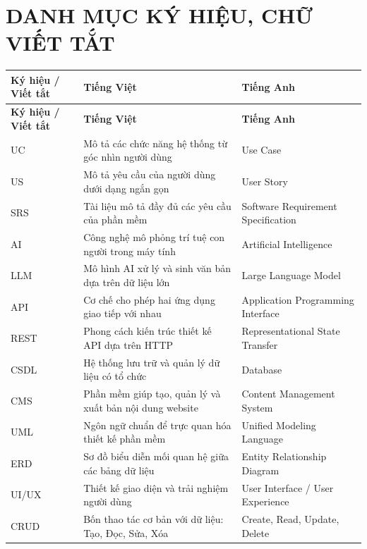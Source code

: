 \documentclass[13pt,a4paper,oneside]{extreport}
\numberwithin{equation}{chapter}
\numberwithin{figure}{chapter}
\numberwithin{table}{chapter}
\begin{document}
\chapter*{DANH MỤC KÝ HIỆU, CHỮ VIẾT TẮT}
\begin{center}
  \begin{longtable}{|>{\centering\arraybackslash}p{}|p{}|p{}|}
    \hline
    \rowcolor[gray]{0.9} \textbf{Ký hiệu / Viết tắt} & \textbf{Tiếng Việt} & \textbf{Tiếng Anh} \\
    \hline
    \endfirsthead
    \hline
    \rowcolor[gray]{0.9} \textbf{Ký hiệu / Viết tắt} & \textbf{Tiếng Việt} & \textbf{Tiếng Anh} \\
    \hline
    \endhead
    \hline
    \endfoot
    UC & Mô tả các chức năng hệ thống từ góc nhìn người dùng & Use Case \\ \hline
    US & Mô tả yêu cầu của người dùng dưới dạng ngắn gọn & User Story \\ \hline
    SRS & Tài liệu mô tả đầy đủ các yêu cầu của phần mềm & Software Requirement Specification \\ \hline
    AI & Công nghệ mô phỏng trí tuệ con người trong máy tính & Artificial Intelligence \\ \hline
    LLM & Mô hình AI xử lý và sinh văn bản dựa trên dữ liệu lớn & Large Language Model \\ \hline
    API & Cơ chế cho phép hai ứng dụng giao tiếp với nhau & Application Programming Interface \\ \hline
    REST & Phong cách kiến trúc thiết kế API dựa trên HTTP & Representational State Transfer \\ \hline
    CSDL & Hệ thống lưu trữ và quản lý dữ liệu có tổ chức & Database \\ \hline
    CMS & Phần mềm giúp tạo, quản lý và xuất bản nội dung website & Content Management System \\ \hline
    UML & Ngôn ngữ chuẩn để trực quan hóa thiết kế phần mềm & Unified Modeling Language \\ \hline
    ERD & Sơ đồ biểu diễn mối quan hệ giữa các bảng dữ liệu & Entity Relationship Diagram \\ \hline
    UI/UX & Thiết kế giao diện và trải nghiệm người dùng & User Interface / User Experience \\ \hline
    CRUD & Bốn thao tác cơ bản với dữ liệu: Tạo, Đọc, Sửa, Xóa & Create, Read, Update, Delete \\ \hline

\end{longtable}
\end{center}
\end{document}
